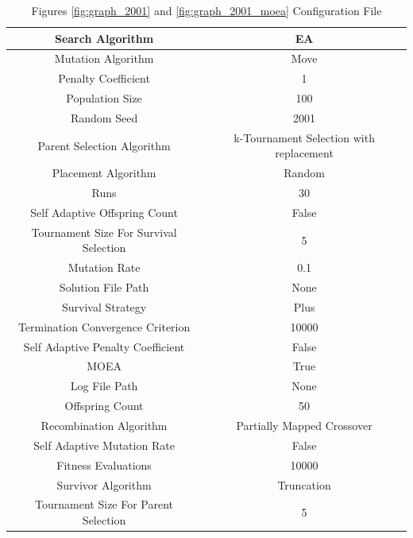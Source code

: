 \documentclass{standalone}
\begin{document}
\begin{table}[!htb]
	\centering
	\caption{Figures \ref{fig:graph_2001} and \ref{fig:graph_2001_moea} Configuration File}
	\label{tab:graph_2001}
	\begin{tabular}{| c | c |}
		\hline
		Search Algorithm		& EA		 \\
		\hline
		Mutation Algorithm		& Move		 \\
		\hline
		Penalty Coefficient		& 1		 \\
		\hline
		Population Size		& 100		 \\
		\hline
		Random Seed		& 2001		 \\
		\hline
		Parent Selection Algorithm		& k-Tournament Selection with replacement		 \\
		\hline
		Placement Algorithm		& Random		 \\
		\hline
		Runs		& 30		 \\
		\hline
		Self Adaptive Offspring Count		& False		 \\
		\hline
		Tournament Size For Survival Selection		& 5		 \\
		\hline
		Mutation Rate		& 0.1		 \\
		\hline
		Solution File Path		& None		 \\
		\hline
		Survival Strategy		& Plus		 \\
		\hline
		Termination Convergence Criterion		& 10000		 \\
		\hline
		Self Adaptive Penalty Coefficient		& False		 \\
		\hline
		MOEA		& True		 \\
		\hline
		Log File Path		& None		 \\
		\hline
		Offspring Count		& 50		 \\
		\hline
		Recombination Algorithm		& Partially Mapped Crossover		 \\
		\hline
		Self Adaptive Mutation Rate		& False		 \\
		\hline
		Fitness Evaluations		& 10000		 \\
		\hline
		Survivor Algorithm		& Truncation		 \\
		\hline
		Tournament Size For Parent Selection		& 5		 \\
		\hline
	\end{tabular}
\end{table}
\end{document}

